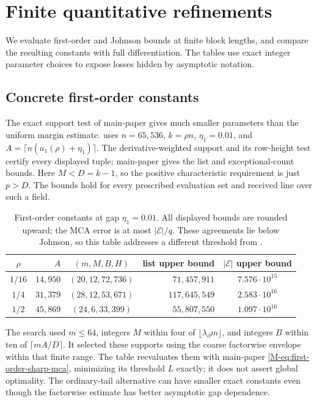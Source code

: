 \documentclass[11pt,letterpaper]{article}
\theoremstyle{definition}
\newcommand{\lambdapartial}{\lambda_{\partial}}
\newcommand{\afirst}{a_1}
\newcommand{\gcurve}{\eta_1}
\begin{document}
 \section{Finite quantitative refinements}
\label{sec:quantitative-refinements}

We evaluate first-order and Johnson bounds at finite block lengths, and
compare the resulting constants with full differentiation. The tables use
exact integer parameter choices to expose losses hidden by asymptotic notation.

\subsection{Concrete first-order constants}

The exact support test of main-paper
 gives much smaller parameters than the
uniform margin estimate.  uses
$n=65{,}536$, $k=\rho n$, $\gcurve=0.01$, and
$A=\lceil n(\afirst(\rho)+\gcurve)\rceil$.
The derivative-weighted support and its row-height test certify every
displayed tuple; main-paper  gives the
list and exceptional-count bounds. Here $M<D=k-1$, so the positive
characteristic requirement is just $p>D$. The bounds hold for every
prescribed evaluation set and received line over such a field.

\begin{table}[H]
\centering\small
\begin{tabular}{c r c r c}
\toprule
$\rho$ & $A$ & $(m,M,B,H)$ & list upper bound & $|\mathcal E|$ upper bound\\
\midrule
$1/16$ & $14{,}950$ & $(20,12,72,736)$ & $71{,}457{,}911$ & $7.576\cdot10^{15}$\\
$1/4$ & $31{,}379$ & $(28,12,53,671)$ & $117{,}645{,}549$ & $2.583\cdot10^{16}$\\
$1/2$ & $45{,}869$ & $(24,6,33,399)$ & $55{,}807{,}550$ & $1.097\cdot10^{16}$\\
\bottomrule
\end{tabular}
\caption{First-order constants at gap $\gcurve=0.01$. All displayed
bounds are rounded upward; the MCA error is at most $|\mathcal E|/q$.
These agreements lie below Johnson, so this table addresses a different
threshold from .}
\label{tab:first-order-gap-constants}
\end{table}

The search used $m\le64$, integers $M$ within four of
$\lfloor\lambdapartial m\rfloor$, and integers $B$ within ten of
$\lceil mA/D\rceil$. It selected these supports using the coarse
factorwise envelope within that finite range. The table reevaluates them
with main-paper \eqref{M-eq:first-order-sharp-mca}, minimizing its threshold
$L$ exactly; it does not assert global optimality. The ordinary-tail
alternative can have smaller exact constants even though the factorwise
estimate has better asymptotic gap dependence.
\end{document}
